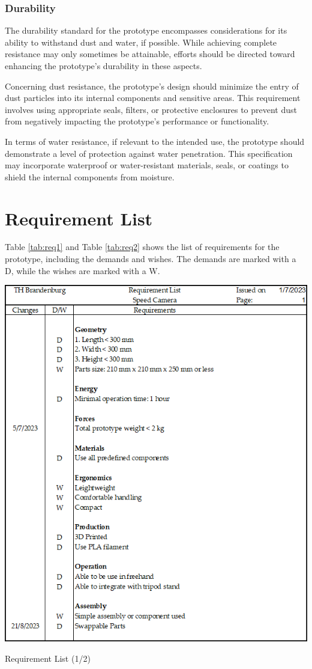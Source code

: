 \subsubsection{Durability}
The durability standard for the prototype encompasses considerations for its ability to withstand dust and water, if possible. While achieving complete resistance may only sometimes be attainable, efforts should be directed toward enhancing the prototype's durability in these aspects.

Concerning dust resistance, the prototype's design should minimize the entry of dust particles into its internal components and sensitive areas. This requirement involves using appropriate seals, filters, or protective enclosures to prevent dust from negatively impacting the prototype's performance or functionality.

In terms of water resistance, if relevant to the intended use, the prototype should demonstrate a level of protection against water penetration. This specification may incorporate waterproof or water-resistant materials, seals, or coatings to shield the internal components from moisture.

\section{Requirement List}
Table \ref{tab:req1} and Table \ref{tab:req2} shows the list of requirements for the prototype, including the demands and wishes. The demands are marked with a D, while the wishes are marked with a W.

\begin{table}[H]
    \centering
    \includegraphics[width= 0.9\linewidth]{texs/Part1/chapter2/image/req1.png}
    \caption{Requirement List (1/2)}
    \label{tab:req1}
\end{table}

